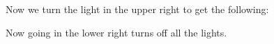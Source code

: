 \documentclass[12pt,letterpaper]{article}
\begin{document}
\begin{enumerate}
Now we turn the light in the upper right to get the following:

   \begin{center}
\begin{chaossudoku}[rows=3,columns=3]
    \begin{puzzlebackground}




    \end{puzzlebackground}
  \end{chaossudoku}
\end{center}

Now going in the lower right turns off all the lights.

\end{enumerate}
\end{document}
